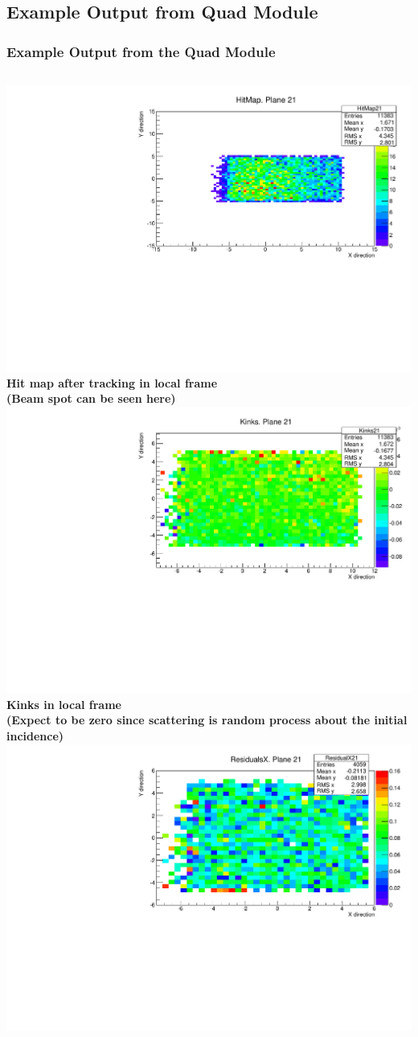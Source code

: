 \documentclass{beamer}
\begin{document}
\subsection{Example Output from Quad Module}
\begin{frame}
\frametitle{Example Output from the Quad Module}
\begin{columns}[t]
\centering
\includegraphics[width=0.8\linewidth]{pics/HitMapQuadAfterTrack.pdf}\\
\tiny{\textbf{Hit map after tracking in local frame \\
(Beam spot can be seen here)}}\\
\includegraphics[width=0.8\linewidth]{pics/kinksQuad.pdf}\\
\tiny{\textbf{Kinks in local frame\\
 (Expect to be zero since scattering is random process about the initial incidence)}}\\
\centering
\includegraphics[width=0.8\linewidth]{pics/QuadXRes73Micron.pdf}\\ 

\end{columns}
\end{frame}
\end{document}
